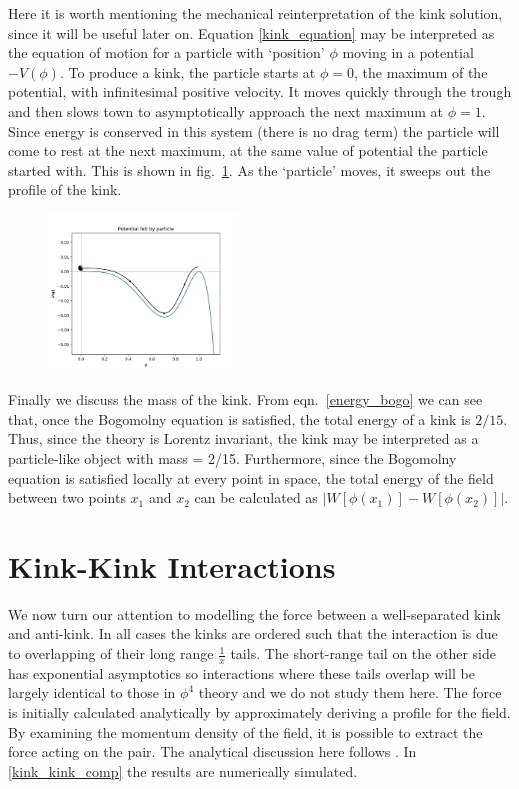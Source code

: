 \documentclass[11pt, oneside]{article}  	%
\numberwithin{equation}{section}
\begin{document}
 Here it is worth mentioning the mechanical reinterpretation of the kink solution, since it will be useful later on. Equation \ref{kink_equation} may be interpreted as the equation of motion for a particle with `position' $\phi$ moving in a potential $-V(\phi)$. To produce a kink, the particle starts at $\phi = 0$, the maximum of the potential, with infinitesimal positive velocity. It moves quickly through the trough and then slows town to asymptotically approach the next maximum at $\phi = 1$. Since energy is conserved in this system (there is no drag term) the particle will come to rest at the next maximum, at the same value of potential the particle started with. This is shown in fig.~\ref{mech}. As the `particle' moves, it sweeps out the profile of the kink.\par
 \begin{figure}
\centering
 \includegraphics[width=0.45\textwidth]{mech_kink.png}
  \label{mech}
\end{figure} 
 Finally we discuss the mass of the kink. From eqn.~\ref{energy_bogo} we can see that, once the Bogomolny equation is satisfied, the total energy of a kink is $2/15$. Thus, since the theory is Lorentz invariant, the kink may be interpreted as a particle-like object with mass = 2/15. Furthermore, since the Bogomolny equation is satisfied locally at every point in space, the total energy of the field between two points $x_1$ and $x_2$ can be calculated as $\left | W\left [ \phi(x_1)\right ] - W\left [ \phi(x_2)\right ]\right |$.
 
 \section{Kink-Kink Interactions}
 We now turn our attention to modelling the force between a well-separated kink and anti-kink. In all cases the kinks are ordered such that the interaction is due to overlapping of their long range $\frac{1}{x}$ tails. The short-range tail on the other side has exponential asymptotics so interactions where these tails overlap will be largely identical to those in $\phi^4$ theory and we do not study them here. The force is initially calculated analytically by approximately deriving a profile for the field. By examining the momentum density of the field, it is possible to extract the force acting on the pair. The analytical discussion here follows \cite{manton-paper}. In \textsection \ref{kink_kink_comp} the results are numerically simulated.\par
\end{document}
